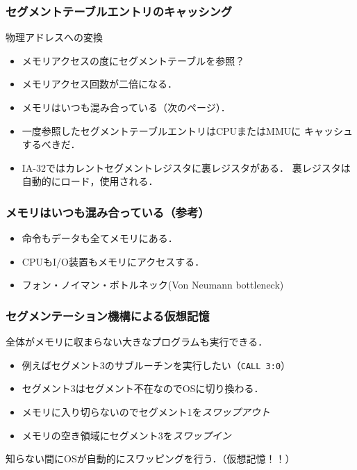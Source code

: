 \documentclass[unicode,handout]{beamer}                   %
\begin{document}
\begin{frame}
  \frametitle{セグメントテーブルエントリのキャッシング}
  物理アドレスへの変換
  \begin{itemize}
  \item メモリアクセスの度にセグメントテーブルを参照？
  \item メモリアクセス回数が二倍になる．
  \item メモリはいつも混み合っている（次のページ）．
  \item 一度参照したセグメントテーブルエントリはCPUまたはMMUに
    キャッシュするべきだ．
  \item IA-32ではカレントセグメントレジスタに裏レジスタがある．
    \vspace{3mm}
    裏レジスタは自動的にロード，使用される．
  \end{itemize}
\end{frame}

\begin{frame}
  \frametitle{メモリはいつも混み合っている（参考）}

  \begin{itemize}
  \item 命令もデータも全てメモリにある．
  \item CPUもI/O装置もメモリにアクセスする．
  \item フォン・ノイマン・ボトルネック(Von Neumann bottleneck)
  \end{itemize}
\end{frame}

\begin{frame}
  \frametitle{セグメンテーション機構による仮想記憶}
  \vspace{3mm}
  全体がメモリに収まらない大きなプログラムも実行できる．
  \begin{itemize}
  \item 例えばセグメント3のサブルーチンを実行したい（\texttt{CALL 3:0}）
  \item セグメント3はセグメント不在なのでOSに切り換わる．
  \item メモリに入り切らないのでセグメント1を\emph{スワップアウト}
  \item メモリの空き領域にセグメント3を\emph{スワップイン}
  \end{itemize}
  知らない間にOSが自動的にスワッピングを行う．（仮想記憶！！）
\end{frame}
\end{document}
